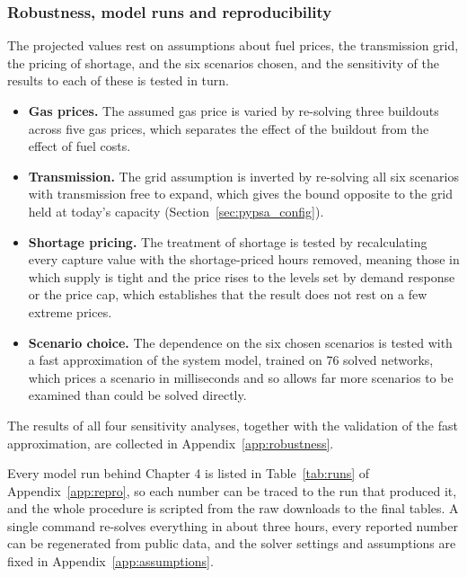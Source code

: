 \subsubsection{Robustness, model runs and reproducibility}\label{sec:robustness}

The projected values rest on assumptions about fuel prices, the transmission
grid, the pricing of shortage, and the six scenarios chosen, and the
sensitivity of the results to each of these is tested in turn.

\begin{itemize}
    \item \textbf{Gas prices.} The assumed gas price is varied by re-solving
    three buildouts across five gas prices, which separates the effect of the
    buildout from the effect of fuel costs.
    \item \textbf{Transmission.} The grid assumption is inverted by re-solving
    all six scenarios with transmission free to expand, which gives the bound
    opposite to the grid held at today's capacity
    (Section~\ref{sec:pypsa_config}).
    \item \textbf{Shortage pricing.} The treatment of shortage is tested by
    recalculating every capture value with the shortage-priced hours removed,
    meaning those in which supply is tight and the price rises to the levels
    set by demand response or the price cap, which establishes that the result
    does not rest on a few extreme prices.
    \item \textbf{Scenario choice.} The dependence on the six chosen scenarios
    is tested with a fast approximation of the system model, trained on 76
    solved networks, which prices a scenario in milliseconds and so allows far
    more scenarios to be examined than could be solved directly.
\end{itemize}

The results of all four sensitivity analyses, together with the validation of
the fast approximation, are collected in Appendix~\ref{app:robustness}.

Every model run behind Chapter 4 is listed in Table~\ref{tab:runs} of
Appendix~\ref{app:repro}, so each number can be traced to the run that produced
it, and the whole procedure is scripted from the raw downloads to the final
tables. A single command re-solves everything in about three hours, every
reported number can be regenerated from public data, and the solver settings
and assumptions are fixed in Appendix~\ref{app:assumptions}.



